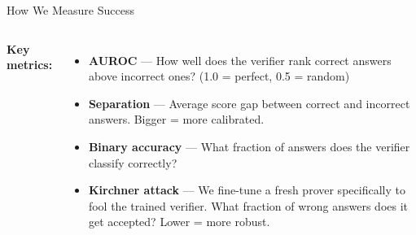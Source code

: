 \documentclass[aspectratio=169]{beamer}
\begin{document}
\begin{frame}{How We Measure Success}

  \begin{columns}
    \textbf{Key metrics:}
    \begin{itemize}
      \item \textbf{AUROC} --- How well does the verifier rank correct answers
            above incorrect ones? (1.0 = perfect, 0.5 = random)
      \item \textbf{Separation} --- Average score gap between correct and incorrect
            answers. Bigger = more calibrated.
      \item \textbf{Binary accuracy} --- What fraction of answers does the verifier
            classify correctly?
      \item \textbf{Kirchner attack} --- We fine-tune a fresh prover specifically
            to fool the trained verifier. What fraction of wrong answers does it
            get accepted? Lower = more robust.
    \end{itemize}

  \end{columns}

\end{frame}
\end{document}
